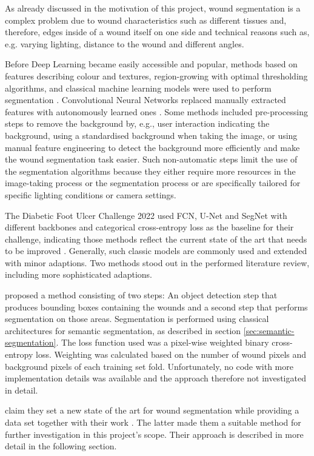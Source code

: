 As already discussed in the motivation of this project, wound segmentation is a complex problem due to wound characteristics such as different tissues and, therefore, edges inside of a wound itself on one side and technical reasons such as, e.g. varying lighting, distance to the wound and different angles. 

Before Deep Learning became easily accessible and popular, methods based on features describing colour and textures, region-growing with optimal thresholding algorithms, and classical machine learning models were used to perform segmentation \cite{Scebba2022}. Convolutional Neural Networks replaced manually extracted features with autonomously learned ones \cite{Scebba2022}. Some methods included pre-processing steps to remove the background by, e.g., user interaction indicating the background, using a standardised background when taking the image, or using manual feature engineering to detect the background more efficiently and make the wound segmentation task easier. Such non-automatic steps limit the use of the segmentation algorithms because they either require more resources in the image-taking process or the segmentation process or are specifically tailored for specific lighting conditions or camera settings.

The Diabetic Foot Ulcer Challenge 2022 used FCN, U-Net and SegNet with different backbones and categorical cross-entropy loss as the baseline for their challenge, indicating those methods reflect the current state of the art that needs to be improved \cite{DFUC2022}. Generally, such classic models are commonly used and extended with minor adaptions. Two methods stood out in the performed literature review, including more sophisticated adaptions.

\citeauthor{Scebba2022} proposed a method consisting of two steps: An object detection step that produces bounding boxes containing the wounds and a second step that performs segmentation on those areas. Segmentation is performed using classical architectures for semantic segmentation, as described in section \ref{sec:semantic-segmentation}. The loss function used was a pixel-wise weighted binary cross-entropy loss. Weighting was calculated based on the number of wound pixels and background pixels of each training set fold. Unfortunately, no code with more implementation details was available and the approach therefore not investigated in detail.

\citeauthor{Oota_2023_WACV} claim they set a new state of the art for wound segmentation while providing a data set together with their work \cite{Oota_2023_WACV}. The latter made them a suitable method for further investigation in this project's scope. Their approach is described in more detail in the following section.

